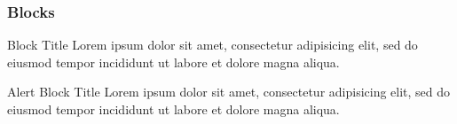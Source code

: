 \label{blocks}
\begin{frame}\frametitle{Blocks}
  \begin{block}{Block Title}
    Lorem ipsum dolor sit amet, consectetur adipisicing elit, sed do eiusmod tempor incididunt ut labore et dolore magna aliqua.
  \end{block}
    \begin{alertblock}{Alert Block Title} 
    Lorem ipsum dolor sit amet, consectetur adipisicing elit, sed do eiusmod tempor incididunt ut labore et dolore magna aliqua.
  \end{alertblock}
\end{frame}
